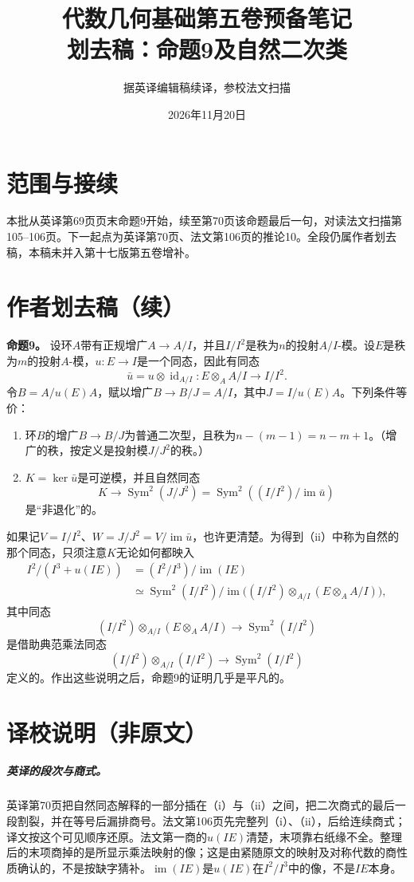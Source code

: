 \documentclass[openany,fontset=fandol]{ctexbook}
\newcommand{\Sym}{\operatorname{Sym}}
\newcommand{\im}{\operatorname{im}}
\begin{document}
\title{代数几何基础第五卷预备笔记\\划去稿：命题9及自然二次类}
\author{据英译编辑稿续译，参校法文扫描}
\date{2026年11月20日}
\maketitle
\chapter*{范围与接续}
本批从英译第69页页末命题9开始，续至第70页该命题最后一句，对读法文扫描第105--106页。下一起点为英译第70页、法文第106页的推论10。全段仍属作者划去稿，本稿未并入第十七版第五卷增补。
\chapter*{作者划去稿（续）}
\noindent\textbf{命题9。}
设环$A$带有正规增广$A\to A/I$，并且$I/I^2$是秩为$n$的投射$A/I$-模。设$E$是秩为$m$的投射$A$-模，$u:E\to I$是一个同态，因此有同态
\[
\bar u=u\otimes\operatorname{id}_{A/I}:
E\otimes_A A/I\longrightarrow I/I^2.
\]
令$B=A/u(E)A$，赋以增广$B\to B/J=A/I$，其中$J=I/u(E)A$。下列条件等价：
\begin{enumerate}
\item[(i)] 环$B$的增广$B\to B/J$为普通二次型，且秩为$n-(m-1)=n-m+1$。（增广的秩，按定义是投射模$J/J^2$的秩。）
\item[(ii)] $K=\ker\bar u$是可逆模，并且自然同态
\[
K\longrightarrow\Sym^2(J/J^2)
        =\Sym^2((I/I^2)/\im\bar u)
\]
是“非退化”的。
\end{enumerate}

如果记$V=I/I^2$、$W=J/J^2=V/\im\bar u$，也许更清楚。为得到（ii）中称为自然的那个同态，只须注意$K$无论如何都映入
\begin{align*}
I^2/(I^3+u(IE))
 &= (I^2/I^3)/\im(IE)\\
 &\simeq\Sym^2(I/I^2)/
       \im\bigl((I/I^2)\otimes_{A/I}(E\otimes_A A/I)\bigr),
\end{align*}
其中同态
\[
(I/I^2)\otimes_{A/I}(E\otimes_A A/I)
        \longrightarrow\Sym^2(I/I^2)
\]
是借助典范乘法同态
\[
(I/I^2)\otimes_{A/I}(I/I^2)\longrightarrow\Sym^2(I/I^2)
\]
定义的。作出这些说明之后，命题9的证明几乎是平凡的。
\chapter*{译校说明（非原文）}
\paragraph{英译的段次与商式。}
英译第70页把自然同态解释的一部分插在（i）与（ii）之间，把二次商式的最后一段割裂，并在等号后漏排商号。法文第106页先完整列（i）、（ii），后给连续商式；译文按这个可见顺序还原。法文第一商的$u(IE)$清楚，末项靠右纸缘不全。整理后的末项商掉的是所显示乘法映射的像；这是由紧随原文的映射及对称代数的商性质确认的，不是按缺字猜补。$\im(IE)$是$u(IE)$在$I^2/I^3$中的像，不是$IE$本身。
\end{document}
